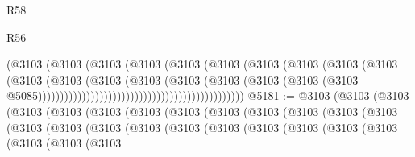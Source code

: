 \begin{lexlean}{R58}
\begin{lexlean}{R56}
\begin{coremodule}
{{{{{{{{{{{{{{{{{{{{{{{{{{{{{{{{{{{{{{{{{{{{{{{{{{{{{{{{{{{{{{{{{{{{{{{{{{{{{{{{{{{{{{{{{{{{{{{{{{{{{{{{{{{{{{{{{{{{{{{{{{{{{{{{{{{{{{{{{{{{{{{{{{{{{{{{{{{{{{{{{{{{{{{{{{{{{{{{{{{{{{{{{{{{{{{{{{{{{{{{{{{{{{{{{{{                                                            (@3103
                                                              (@3103
                                                                (@3103
                                                                  (@3103
                                                                    (@3103
                                                                      (@3103
                                                                        (@3103
                                                                          (@3103
                                                                            (@3103
                                                                              (@3103
                                                                                (@3103
                                                                                  (@3103
                                                                                    (@3103
                                                                                      (@3103
                                                                                        (@3103
                                                                                          (@3103
                                                                                            (@3103
                                                                                              (@3103
                                                                                                (@3103
                                                                                                  @5085)))))))))))))))))))))))))))))))))))))))))))))))
@5181 := @3103
    (@3103
      (@3103
        (@3103
          (@3103
            (@3103
              (@3103
                (@3103
                  (@3103
                    (@3103
                      (@3103
                        (@3103
                          (@3103
                            (@3103
                              (@3103
                                (@3103
                                  (@3103
                                    (@3103
                                      (@3103
                                        (@3103
                                          (@3103
                                            (@3103
                                              (@3103
                                                (@3103
                                                  (@3103
                                                    (@3103
}}}}}}}}}}}}}}}}}}}}}}}}}}}}}}}}}}}}}}}}}}}}}}}}}}}}}}}}}}}}}}}}}}}}}}}}}}}}}}}}}}}}}}}}}}}}}}}}}}}}}}}}}}}}}}}}}}}}}}}}}}}}}}}}}}}}}}}}}}}}}}}}}}}}}}}}}}}}}}}}}}}}}}}}}}}}}}}}}}}}}}}}}}}}}}}}}}}}}}}}}}}}}}}}}}}
\end{coremodule}
\end{lexlean}
\end{lexlean}
